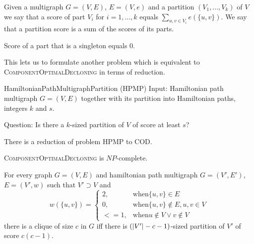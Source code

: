 \begin{defn}
Given a multigraph $G=(V,E)$, $E=(V,e)$ and a partition $(V_1, ..., V_k)$ of $V$
we say that a score of part $V_i$ for $i=1,...,k$ equals $\sum_{u,v \in V_i} e(\{u,v\})$.
We say that a partition score is a sum of the scores of its parts.
\end{defn}

\begin{rmrk}
Score of a part that is a singleton equals $0$.
\end{rmrk}

This lets us to formulate another problem which is equivalent to \textsc{ComponentOptimalDecloning}
in terms of reduction.

\begin{problem}{HamiltonianPathMultigraphPartition (HPMP)}
	Input: Hamiltonian path multigraph $G=(V,E)$
		together with its partition into Hamiltonian paths, integers $k$ and $s$.

	Question: Is there a $k$-sized partition of $V$ of score at least $s$?
\end{problem}

\begin{rmrk}
There is a reduction of problem \textsc{HPMP} to \textsc{COD}.
\end{rmrk}

\begin{thm} \label{ultimate-theorem}
\textsc{ComponentOptimalDecloning} is $NP$-complete.
\end{thm}

\begin{lmm} \label{hpmd-red}
For every graph $G=(V,E)$ and hamiltonian path multigraph $G=(V',E')$, $E=(V',w)$ such that $V' \supset V$ and
$$ w(\{u,v\}) =
\begin{cases}
2, &\text{when} \{u,v\} \in E \\
0, &\text{when} \{u,v\} \not\in E, u,v \in V \\
<= 1, &\text{when} u \not\in V \vee v \not\in V
\end{cases}
$$
there is a clique of size $c$ in $G$ iff
there is $\left(\left\vert V' \right\vert-c-1\right)$-sized partition of $V'$ of score $c(c-1)$.
\end{lmm}

